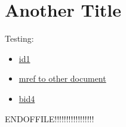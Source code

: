 \chapter{Another Title}
\label{\detokenize{test_crosspage:another-title}}\label{\detokenize{test_crosspage::doc}}
\sphinxAtStartPar
Testing:
\begin{itemize}
\item {} 
\sphinxAtStartPar
\hyperlink{\detokenize{id1}}{id1}

\item {} 
\sphinxAtStartPar
\hyperlink{\detokenize{test-mid99-id0}}{\hypertarget{\detokenize{test_crosspage-mid99-id0}}{mref to other document}}

\item {} 
\sphinxAtStartPar
\hyperlink{\detokenize{bid4}}{\hypertarget{\detokenize{bid4-ref1}}{bid4}}

\end{itemize}

\sphinxAtStartPar
ENDOFFILE!!!!!!!!!!!!!!!!!



\renewcommand{\indexname}{Index}
\printindex
